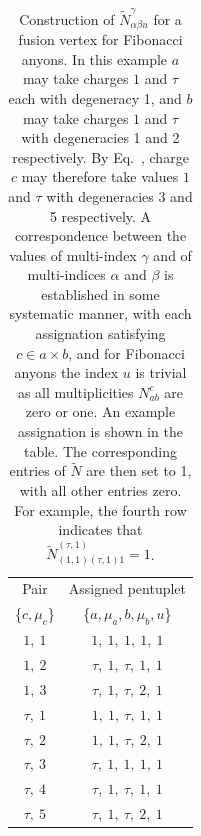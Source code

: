 \documentclass[aps,prb,reprint,superscriptaddress,amsfonts,amsmath,amssymb,showpacs,floatfix]{revtex4-1}
\newcommand{\mbb}[1]{\mathbb{#1}}
\newcommand{\mc}[1]{\mathcal{#1}}
\newcommand{\eref}[1]{(\ref{#1})}
\newcommand{\p}[1]{\phantom{#1}}
\begin{document}
\begin{table}
\begin{tabular}{c|c}
Pair & Assigned pentuplet \\
\{$c,\mu_c$\} & \{$a,\mu_a,b,\mu_b,u$\} \\
\hline
$1,~1$ & $1,~1,~1,~1,~1$ \\
$1,~2$ & $\tau,~1,~\tau,~1,~1$ \\
$1,~3$ & $\tau,~1,~\tau,~2,~1$ \\
$\tau,~1$ & $1,~1,~\tau,~1,~1$ \\
$\tau,~2$ & $1,~1,~\tau,~2,~1$ \\
$\tau,~3$ & $\tau,~1,~1,~1,~1$ \\
$\tau,~4$ & $\tau,~1,~\tau,~1,~1$ \\
$\tau,~5$ & $\tau,~1,~\tau,~2,~1$
\end{tabular}
\caption{Construction of $\tilde N^\gamma_{\alpha\beta u}$ for a fusion vertex for Fibonacci anyons.
In this example $a$ may take charges $1$ and $\tau$ each with degeneracy 1, and $b$ may take charges $1$ and $\tau$ with degeneracies 1 and 2 respectively. By Eq.~\protect{\eref{eq:compounddegens}}, charge $c$ may therefore take values $1$ and $\tau$ with degeneracies 3 and 5 respectively.
A correspondence between the values of multi-index $\gamma$ and of multi-indices $\alpha$ and $\beta$ is established in some systematic manner, with each assignation satisfying $c\in a\times b$, and for Fibonacci anyons the index $u$ is trivial as all multiplicities $N^c_{ab}$ are zero or one.
An example %
assignation is shown in the table. The corresponding entries of $\tilde N$ are then set to %
1, with all other entries zero. For example, the fourth row indicates that $\tilde N^{(\tau,1)}_{(1,1)(\tau,1)1}=1$.\label{tab:exampleN}}
\end{table}

\end{document}
